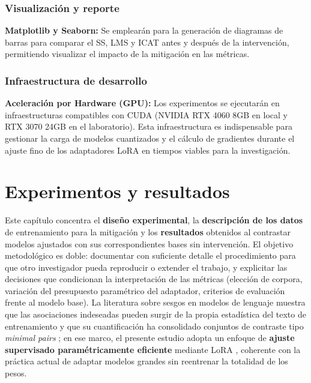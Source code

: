 \documentclass[12pt,a4paper]{report}
\begin{document}
\subsection{Visualización y reporte}
\label{subsec:visualizacion}

\textbf{Matplotlib y Seaborn:} Se emplearán para la generación de diagramas de barras para comparar el SS, LMS y ICAT antes y después de la intervención, 
permitiendo visualizar el impacto de la mitigación en las métricas.

\subsection{Infraestructura de desarrollo}
\label{subsec:infraestructura}

\textbf{Aceleración por Hardware (GPU):} Los experimentos se ejecutarán en infraestructuras compatibles con CUDA (NVIDIA RTX 4060 8GB en local y RTX 3070 24GB en el laboratorio). 
Esta infraestructura es indispensable para gestionar la carga de modelos cuantizados y el cálculo de gradientes durante el ajuste fino de los adaptadores LoRA en tiempos 
viables para la investigación.


\chapter{Experimentos y resultados}
\label{chap:experimentos_resultados}

Este capítulo concentra el \textbf{diseño experimental}, la \textbf{descripción de los datos} de entrenamiento para la mitigación y los \textbf{resultados} obtenidos al contrastar modelos ajustados con sus correspondientes bases sin intervención. El objetivo metodológico es doble: documentar con suficiente detalle el procedimiento para que otro investigador pueda reproducir o extender el trabajo, y explicitar las decisiones que condicionan la interpretación de las métricas (elección de corpora, variación del presupuesto paramétrico del adaptador, criterios de evaluación frente al modelo base). La literatura sobre sesgos en modelos de lenguaje muestra que las asociaciones indeseadas pueden surgir de la propia estadística del texto de entrenamiento \cite{caliskan_semantics_2017} y que su cuantificación ha consolidado conjuntos de contraste tipo \textit{minimal pairs} \cite{nangia_crows-pairs_2020,nadeem_stereoset_2021}; en ese marco, el presente estudio adopta un enfoque de \textbf{ajuste supervisado paramétricamente eficiente} mediante LoRA \cite{hu_lora_2021}, coherente con la práctica actual de adaptar modelos grandes sin reentrenar la totalidad de los pesos.
\end{document}

